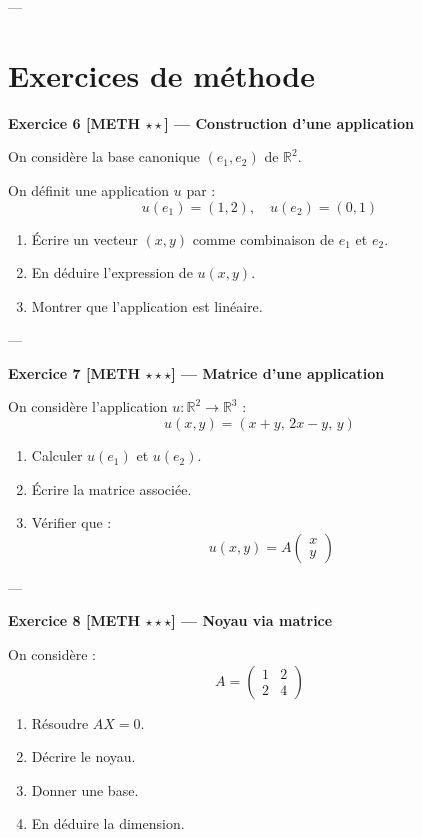 \documentclass[11pt,a4paper]{article}
\begin{document}
---

\section{Exercices de méthode}

\textbf{Exercice 6 [METH $\star\star$] — Construction d’une application}

On considère la base canonique $(e_1,e_2)$ de $\mathbb{R}^2$.

On définit une application $u$ par :
\[
u(e_1) = (1,2), \quad u(e_2) = (0,1)
\]

\begin{enumerate}
\item Écrire un vecteur $(x,y)$ comme combinaison de $e_1$ et $e_2$.
\item En déduire l'expression de $u(x,y)$.
\item Montrer que l'application est linéaire.
\end{enumerate}

---

\textbf{Exercice 7 [METH $\star\star\star$] — Matrice d’une application}

On considère l'application $u : \mathbb{R}^2 \to \mathbb{R}^3$ :
\[
u(x,y) = (x+y,\, 2x-y,\, y)
\]

\begin{enumerate}
\item Calculer $u(e_1)$ et $u(e_2)$.
\item Écrire la matrice associée.
\item Vérifier que :
\[
u(x,y) = A \begin{pmatrix} x \\ y \end{pmatrix}
\]
\end{enumerate}

---

\textbf{Exercice 8 [METH $\star\star\star$] — Noyau via matrice}

On considère :
\[
A =
\begin{pmatrix}
1 & 2 \\
2 & 4
\end{pmatrix}
\]

\begin{enumerate}
\item Résoudre $AX = 0$.
\item Décrire le noyau.
\item Donner une base.
\item En déduire la dimension.
\end{enumerate}
\end{document}
